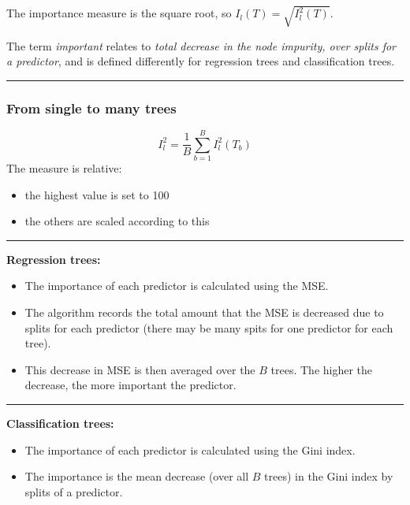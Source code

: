 \documentclass[
  letterpaper,
  DIV=11,
  numbers=noendperiod]{scrartcl}
\providecommand{\tightlist}{%
  \setlength{\itemsep}{0pt}\setlength{\parskip}{0pt}}\usepackage{longtable,booktabs,array}
\begin{document}
The importance measure is the square root, so
\(I_l(T)= \sqrt{I_l^2(T)}\).

The term \emph{important} relates to \emph{total decrease in the node
impurity, over splits for a predictor}, and is defined differently for
regression trees and classification trees.

\begin{center}\rule{0.5\linewidth}{0.5pt}\end{center}

\hypertarget{from-single-to-many-trees}{%
\subsubsection{From single to many
trees}\label{from-single-to-many-trees}}

\[I_l^2=\frac{1}{B} \sum_{b=1}^B I_l^2(T_b)\] The measure is relative:

\begin{itemize}
\tightlist
\item
  the highest value is set to 100
\item
  the others are scaled according to this
\end{itemize}

\begin{center}\rule{0.5\linewidth}{0.5pt}\end{center}

\textbf{Regression trees:}

\begin{itemize}
\tightlist
\item
  The importance of each predictor is calculated using the MSE.
\item
  The algorithm records the total amount that the MSE is decreased due
  to splits for each predictor (there may be many spits for one
  predictor for each tree).
\item
  This decrease in MSE is then averaged over the \(B\) trees. The higher
  the decrease, the more important the predictor.
\end{itemize}

\begin{center}\rule{0.5\linewidth}{0.5pt}\end{center}

\textbf{Classification trees:}

\begin{itemize}
\tightlist
\item
  The importance of each predictor is calculated using the Gini index.
\item
  The importance is the mean decrease (over all \(B\) trees) in the Gini
  index by splits of a predictor.
\end{itemize}
\end{document}
